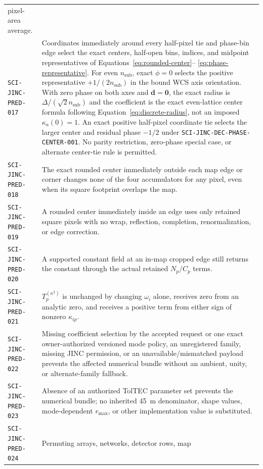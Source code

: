 \begin{longtable}{@{}>{\raggedright\arraybackslash}p{}
                        >{\raggedright\arraybackslash}p{}@{}}
pixel-area average. \\
\texttt{SCI-JINC-PRED-017} & Coordinates immediately around every half-pixel
tie and phase-bin edge select the exact centers, half-open bins, indices, and
midpoint representatives of Equations~\eqref{eq:rounded-center}--
\eqref{eq:phase-representative}.  For even $n_{\mathrm{sub}}$, exact
$\phi=0$ selects the positive representative $+1/(2n_{\mathrm{sub}})$ in the
bound WCS axis orientation.  With zero phase on both axes and
$\boldsymbol d=\boldsymbol0$, the exact radius is
$\Delta/(\sqrt{2}n_{\mathrm{sub}})$ and the coefficient is
the exact even-lattice center formula following
Equation~\eqref{eq:discrete-radius}, not an imposed
$\kappa_a(0)=1$.  An exact positive half-pixel coordinate tie selects the
larger center and residual phase $-1/2$ under
\texttt{SCI-JINC-DEC-PHASE-CENTER-001}.  No parity restriction, zero-phase
special case, or alternate center-tie rule is permitted. \\
\texttt{SCI-JINC-PRED-018} & The exact rounded center immediately outside each map
edge or corner changes none of the four accumulators for any pixel, even when
its square footprint overlaps the map. \\
\texttt{SCI-JINC-PRED-019} & A rounded center immediately inside an edge uses
only retained square pixels with no wrap, reflection, completion,
renormalization, or edge correction. \\
\texttt{SCI-JINC-PRED-020} & A supported constant field at an in-map cropped
edge still returns the constant through the actual retained $N_p/C_p$ terms. \\
\texttt{SCI-JINC-PRED-021} & $T_p^{(\kappa^2)}$ is unchanged by changing
$\omega_i$ alone, receives zero from an analytic zero, and receives a positive
term from either sign of nonzero $\kappa_{ip}$. \\
\texttt{SCI-JINC-PRED-022} & Missing coefficient selection by the accepted
request or one exact owner-authorized versioned mode policy, an unregistered
family, missing JINC permission, or an unavailable/mismatched payload prevents
the affected numerical bundle without an ambient, unity, or alternate-family
fallback. \\
\texttt{SCI-JINC-PRED-023} & Absence of an authorized TolTEC parameter set
prevents the numerical bundle; no inherited 45~m denominator, shape values,
mode-dependent $r_{\max}$, or other implementation value is substituted. \\
\texttt{SCI-JINC-PRED-024} & Permuting arrays, networks, detector rows, map

\end{longtable}

